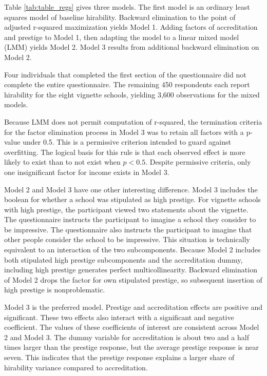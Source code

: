 Table \ref{tab:table_regs} gives three models.
The first model is an ordinary least squares model of baseline hirability.
Backward elimination to the point of adjusted r-squared maximization yields Model 1.
Adding factors of accreditation and prestige to Model 1,
then adapting the model to a linear mixed model (LMM) yields Model 2.
Model 3 results from additional backward elimination on Model 2.

Four individuals that completed the first section of the questionnaire
did not complete the entire questionnaire.
The remaining 450 respondents each report hirability for the eight vignette schools,
yielding 3,600 observations for the mixed models.

Because LMM does not permit computation of r-squared,
the termination criteria for the factor elimination process in Model 3
was to retain all factors with a p-value under 0.5.
This is a permissive criterion intended to guard against overfitting.
The logical basis for this rule is that each observed effect is
more likely to exist than to not exist when $p < 0.5$.
Despite permissive criteria, only one insignificant factor for income exists in Model 3.


Model 2 and Model 3 have one other interesting difference.
Model 3 includes the boolean for whether a school was stipulated as high prestige.
For vignette schools with high prestige, the participant viewed two statements about the vignette.
The questionnaire instructs the participant to imagine a school they consider to be impressive.
The questionnaire also instructs the participant to imagine that other people consider the school to be impressive.
This situation is technically equivalent to an interaction of the two subcomponents.
Because Model 2 includes both stipulated high prestige subcomponents and the accreditation dummy, including high prestige generates perfect multicollinearity.
Backward elimination of Model 2 drops the factor for own stipulated prestige, so subsequent insertion of high prestige is nonproblematic.

Model 3 is the preferred model.
Prestige and accreditation effects are positive and significant.
These two effects also interact with a significant and negative coefficient.
The values of these coefficients of interest are consistent across Model 2 and Model 3.
The dummy variable for accreditation is about two and a half times larger than the prestige response,
but the average prestige response is near seven.
This indicates that the prestige response explains a larger share of hirability variance compared to accreditation.

